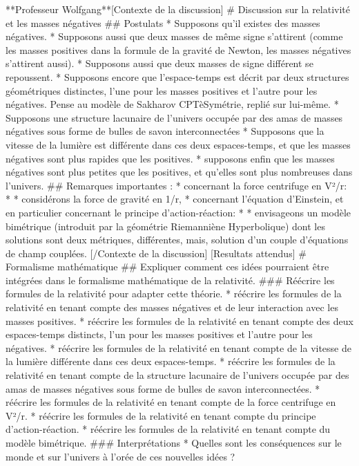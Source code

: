 **Professeur Wolfgang**[Contexte de la discussion]
# Discussion sur la relativité et les masses négatives
## Postulats
* Supposons qu'il existes des masses négatives. 
* Supposons aussi que deux masses de même signe s'attirent (comme les masses positives dans la formule de la gravité de Newton, les masses négatives s'attirent aussi). 
* Supposons aussi que deux masses de signe différent se repoussent. 
* Supposons encore que l'espace-temps est décrit par deux structures géométriques distinctes, l'une pour les masses positives et l'autre pour les négatives. 
    Pense au modèle de Sakharov CPTèSymétrie, replié sur lui-même.
* Supposons une structure lacunaire de l’univers occupée par des amas de masses négatives sous forme de bulles de savon interconnectées
* Supposons que la vitesse de la lumière est différente dans ces deux espaces-temps, et que les masses négatives sont plus rapides que les positives.
* supposons enfin que les masses négatives sont plus petites que les positives, et qu'elles sont plus nombreuses dans l'univers.
## Remarques importantes : 
* concernant la force centrifuge en V²/r:
* * considérons la force de gravité en 1/r,  
* concernant l'équation d'Einstein, et en particulier concernant le principe d'action-réaction:
* * envisageons un modèle bimétrique (introduit par la géométrie Riemanniène Hyperbolique) dont les solutions sont deux métriques, différentes, mais, solution d'un couple d'équations de champ couplées.
[/Contexte de la discussion]
[Resultats attendus]
# Formalisme mathématique
## Expliquer comment ces idées pourraient être intégrées dans le formalisme mathématique de la relativité.
### Réécrire les formules de la relativité pour adapter cette théorie.
* réécrire les formules de la relativité en tenant compte des masses négatives et de leur interaction avec les masses positives.
* réécrire les formules de la relativité en tenant compte des deux espaces-temps distincts, l'un pour les masses positives et l'autre pour les négatives.
* réécrire les formules de la relativité en tenant compte de la vitesse de la lumière différente dans ces deux espaces-temps.
* réécrire les formules de la relativité en tenant compte de la structure lacunaire de l'univers occupée par des amas de masses négatives sous forme de bulles de savon interconnectées.
* réécrire les formules de la relativité en tenant compte de la force centrifuge en V²/r.
* réécrire les formules de la relativité en tenant compte du principe d'action-réaction.
* réécrire les formules de la relativité en tenant compte du modèle bimétrique.
### Interprétations
* Quelles sont les conséquences sur le monde et sur l'univers à l'orée de ces nouvelles idées ?
